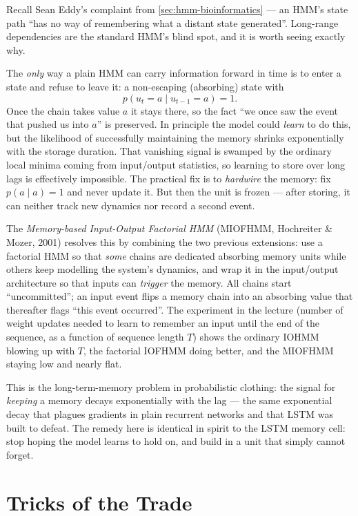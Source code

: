 \documentclass[11pt, oneside]{book}
\begin{document}
Recall Sean Eddy's complaint from \cref{sec:hmm-bioinformatics} — an HMM's state
path ``has no way of remembering what a distant state generated''. Long-range
dependencies are the standard HMM's blind spot, and it is worth seeing exactly
why.

The \emph{only} way a plain HMM can carry information forward in time is to enter
a state and refuse to leave it: a non-escaping (absorbing) state with
\[
  p(u_t = a \mid u_{t-1} = a) = 1.
\]
Once the chain takes value $a$ it stays there, so the fact ``we once saw the
event that pushed us into $a$'' is preserved. In principle the model could
\emph{learn} to do this, but the likelihood of successfully maintaining the
memory shrinks exponentially with the storage duration. That vanishing signal is
swamped by the ordinary local minima coming from input/output statistics, so
learning to store over long lags is effectively impossible. The practical fix is
to \emph{hardwire} the memory: fix $p(a \mid a) = 1$ and never update it. But
then the unit is frozen — after storing, it can neither track new dynamics nor
record a second event.

The \emph{Memory-based Input-Output Factorial HMM} (MIOFHMM, Hochreiter \&
Mozer, 2001) resolves this by combining the two previous extensions: use a
factorial HMM so that \emph{some} chains are dedicated absorbing memory units
while others keep modelling the system's dynamics, and wrap it in the
input/output architecture so that inputs can \emph{trigger} the memory. All
chains start ``uncommitted''; an input event flips a memory chain into an
absorbing value that thereafter flags ``this event occurred''. The experiment in
the lecture (number of weight updates needed to learn to remember an input until
the end of the sequence, as a function of sequence length $T$) shows the
ordinary IOHMM blowing up with $T$, the factorial IOFHMM doing better, and the
MIOFHMM staying low and nearly flat.

\begin{intbox}
This is the long-term-memory problem in probabilistic clothing: the signal for
\emph{keeping} a memory decays exponentially with the lag — the same exponential
decay that plagues gradients in plain recurrent networks and that LSTM was built
to defeat. The remedy here is identical in spirit to the LSTM memory cell: stop
hoping the model learns to hold on, and build in a unit that simply cannot
forget.
\end{intbox}

\section{Tricks of the Trade}
\end{document}
